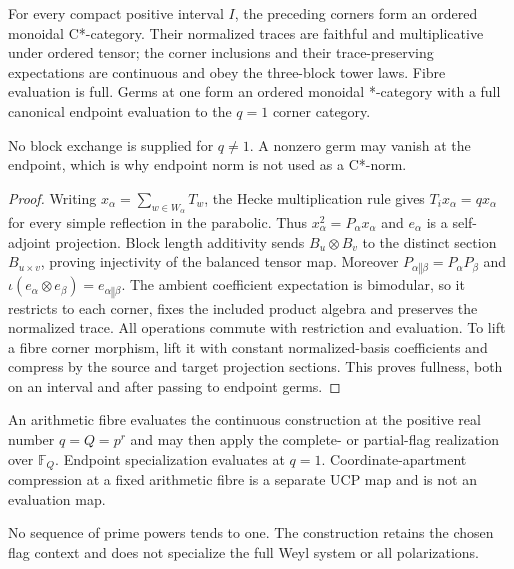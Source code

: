 \begin{theorem}
{\normalfont\statusProved}\quad
For every compact positive interval $I$, the preceding corners form an
ordered monoidal C*-category.  Their normalized traces are faithful and
multiplicative under ordered tensor; the corner inclusions and their
trace-preserving expectations are continuous and obey the three-block tower
laws.  Fibre evaluation is full.  Germs at one form an ordered monoidal
*-category with a full canonical endpoint evaluation to the $q=1$ corner
category.
\end{theorem}
\begin{scope}
No block exchange is supplied for $q\neq1$.  A nonzero germ may vanish at
the endpoint, which is why endpoint norm is not used as a C*-norm.
\end{scope}
\begin{proof}
Writing $x_\alpha=\sum_{w\in W_\alpha}T_w$, the Hecke multiplication rule
gives $T_ix_\alpha=qx_\alpha$ for every simple reflection in the parabolic.
Thus $x_\alpha^2=P_\alpha x_\alpha$ and $e_\alpha$ is a self-adjoint
projection.  Block length additivity sends
$B_u\otimes B_v$ to the distinct section $B_{u\times v}$, proving
injectivity of the balanced tensor map.  Moreover
$P_{\alpha\mathbin\Vert\beta}=P_\alpha P_\beta$ and
$\iota(e_\alpha\otimes e_\beta)=e_{\alpha\mathbin\Vert\beta}$.
The ambient coefficient expectation is bimodular, so it restricts to each
corner, fixes the included product algebra and preserves the normalized
trace.  All operations commute with restriction and evaluation.  To lift a
fibre corner morphism, lift it with constant normalized-basis coefficients
and compress by the source and target projection sections.  This proves
fullness, both on an interval and after passing to endpoint germs.
\end{proof}

\begin{definition}
An arithmetic fibre evaluates the continuous construction at the positive
real number $q=Q=p^r$ and may then apply the complete- or partial-flag
realization over $\mathbb F_Q$.  Endpoint specialization evaluates at
$q=1$.  Coordinate-apartment compression at a fixed arithmetic fibre is a
separate UCP map and is not an evaluation map.
\end{definition}
\begin{scope}
No sequence of prime powers tends to one.  The construction retains the
chosen flag context and does not specialize the full Weyl system or all
polarizations.
\end{scope}

